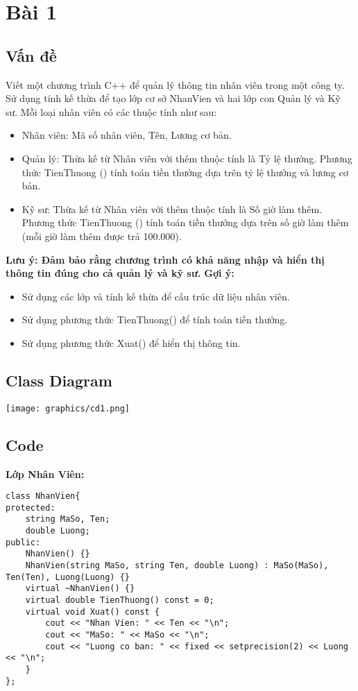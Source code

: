 \clearpage
\section{Bài 1}
\subsection{Vấn đề}
Viết một chương trình C++ để quản lý thông tin nhân viên trong một công ty. Sử dụng
tính kế thừa để tạo lớp cơ sở NhanVien và hai lớp con Quản lý và Kỹ sư. Mỗi loại nhân
viên có các thuộc tính như sau:
\begin{itemize}
    \item Nhân viên: Mã số nhân viên, Tên, Lương cơ bản.
    \item Quản lý: Thừa kế từ Nhân viên với thêm thuộc tính là Tỷ lệ thưởng. Phương thức TienThuong () tính toán tiền thưởng dựa trên tỷ lệ thưởng và lương cơ bản.
    \item Kỹ sư: Thừa kế từ Nhân viên với thêm thuộc tính là Số giờ làm thêm. Phương
thức TienThuong () tính toán tiền thưởng dựa trên số giờ làm thêm (mỗi giờ làm
thêm được trả 100.000).
\end{itemize}
\textbf{Lưu ý: Đảm bảo rằng chương trình có khả năng nhập và hiển thị thông tin đúng cho cả quản lý và kỹ sư.}
\newline 
\textbf{Gợi ý:} 
\begin{itemize}
    \item Sử dụng các lớp và tính kế thừa để cấu trúc dữ liệu nhân viên.
    \item Sử dụng phương thức TienThuong() để tính toán tiền thưởng.
    \item Sử dụng phương thức Xuat() để hiển thị thông tin.
\end{itemize}
\subsection{Class Diagram}
\texttt{[image: graphics/cd1.png]}
\subsection{Code}
\item {\textbf{Lớp Nhân Viên: }}
\begin{verbatim}
class NhanVien{
protected:
    string MaSo, Ten;
    double Luong;
public:
    NhanVien() {} 
    NhanVien(string MaSo, string Ten, double Luong) : MaSo(MaSo), Ten(Ten), Luong(Luong) {}
    virtual ~NhanVien() {}
    virtual double TienThuong() const = 0;
    virtual void Xuat() const {
        cout << "Nhan Vien: " << Ten << "\n";
        cout << "MaSo: " << MaSo << "\n";
        cout << "Luong co ban: " << fixed << setprecision(2) << Luong << "\n";
    }
};
\end{verbatim}

